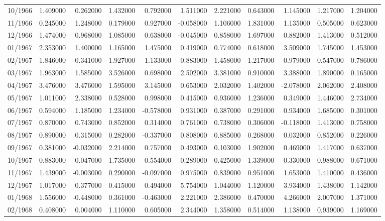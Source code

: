 \begin{tabular}{lrrrrrrrrrr}
10/1966 & 1.409000 & 0.262000 & 1.432000 & 0.792000 & 1.511000 & 2.221000 & 0.643000 & 1.145000 & 1.217000 & 1.204000 \\
11/1966 & 0.245000 & 1.248000 & 0.179000 & 0.927000 & -0.058000 & 1.106000 & 1.831000 & 1.135000 & 0.505000 & 0.623000 \\
12/1966 & 1.474000 & 0.968000 & 1.085000 & 0.638000 & -0.045000 & 0.858000 & 1.697000 & 0.882000 & 1.413000 & 0.512000 \\
01/1967 & 2.353000 & 1.400000 & 1.165000 & 1.475000 & 0.419000 & 0.774000 & 0.618000 & 3.509000 & 1.745000 & 1.453000 \\
02/1967 & 1.846000 & -0.341000 & 1.927000 & 1.133000 & 0.883000 & 1.458000 & 1.217000 & 0.979000 & 0.547000 & 0.786000 \\
03/1967 & 1.963000 & 1.585000 & 3.526000 & 0.698000 & 2.502000 & 3.381000 & 0.910000 & 3.388000 & 1.890000 & 0.165000 \\
04/1967 & 3.476000 & 3.476000 & 1.595000 & 3.145000 & 0.653000 & 2.032000 & 1.402000 & -2.078000 & 2.062000 & 2.408000 \\
05/1967 & 1.011000 & 2.338000 & 0.528000 & 0.998000 & 0.415000 & 0.936000 & 1.236000 & 0.349000 & 1.446000 & 2.734000 \\
06/1967 & 0.594000 & 1.185000 & 1.234000 & -0.578000 & 0.931000 & 0.387000 & 0.291000 & 0.934000 & 1.685000 & 0.301000 \\
07/1967 & 0.870000 & 0.743000 & 0.852000 & 0.314000 & 0.761000 & 0.738000 & 0.306000 & -0.118000 & 1.413000 & 0.758000 \\
08/1967 & 0.890000 & 0.315000 & 0.282000 & -0.337000 & 0.808000 & 0.885000 & 0.268000 & 0.032000 & 0.852000 & 0.226000 \\
09/1967 & 0.381000 & -0.032000 & 2.214000 & 0.757000 & 0.493000 & 0.103000 & 1.902000 & 0.469000 & 1.417000 & 0.637000 \\
10/1967 & 0.883000 & 0.047000 & 1.735000 & 0.554000 & 0.289000 & 0.425000 & 1.339000 & 0.330000 & 0.988000 & 0.671000 \\
11/1967 & 1.439000 & -0.003000 & 0.290000 & -0.097000 & 0.975000 & 0.839000 & 0.951000 & 1.653000 & 1.410000 & 0.436000 \\
12/1967 & 1.017000 & 0.377000 & 0.415000 & 0.494000 & 5.754000 & 1.044000 & 1.120000 & 3.934000 & 1.438000 & 1.142000 \\
01/1968 & 1.556000 & -0.448000 & 0.361000 & -0.463000 & 2.221000 & 2.386000 & 0.470000 & 4.266000 & 2.007000 & 1.371000 \\
02/1968 & 0.408000 & 0.004000 & 1.110000 & 0.605000 & 2.344000 & 1.358000 & 0.514000 & 1.138000 & 0.939000 & 1.169000 \\

\end{tabular}
